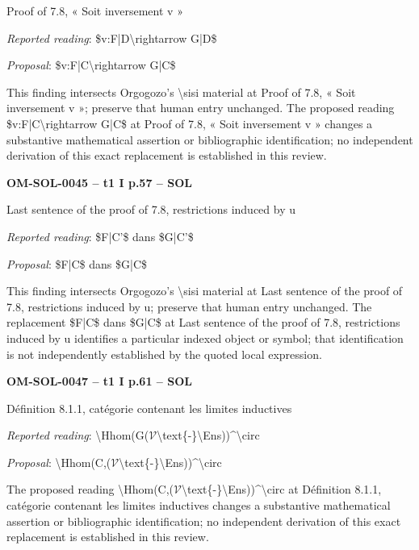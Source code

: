 Proof of 7.8, « Soit inversement v »\par
\emph{Reported reading}: \$v:F|D\textbackslash{}rightarrow G|D\$\par
\emph{Proposal}: \$v:F|C\textbackslash{}rightarrow G|C\$\par
This finding intersects Orgogozo's \textbackslash{}sisi material at Proof of 7.8, « Soit inversement v »; preserve that human entry unchanged. The proposed reading \$v:F|C\textbackslash{}rightarrow G|C\$ at Proof of 7.8, « Soit inversement v » changes a substantive mathematical assertion or bibliographic identification; no independent derivation of this exact replacement is established in this review.\par
\par\noindent\textbf{OM-SOL-0045 -- t1 I p.57 -- SOL}\par
Last sentence of the proof of 7.8, restrictions induced by u\par
\emph{Reported reading}: \$F|C'\$ dans \$G|C'\$\par
\emph{Proposal}: \$F|C\$ dans \$G|C\$\par
This finding intersects Orgogozo's \textbackslash{}sisi material at Last sentence of the proof of 7.8, restrictions induced by u; preserve that human entry unchanged. The replacement \$F|C\$ dans \$G|C\$ at Last sentence of the proof of 7.8, restrictions induced by u identifies a particular indexed object or symbol; that identification is not independently established by the quoted local expression.\par
\par\noindent\textbf{OM-SOL-0047 -- t1 I p.61 -- SOL}\par
Définition 8.1.1, catégorie contenant les limites inductives\par
\emph{Reported reading}: \textbackslash{}Hhom(G(\ensuremath{𝒱}\textbackslash{}text\{-\}\textbackslash{}Ens))\textasciicircum{}\textbackslash{}circ\par
\emph{Proposal}: \textbackslash{}Hhom(C,(\ensuremath{𝒱}\textbackslash{}text\{-\}\textbackslash{}Ens))\textasciicircum{}\textbackslash{}circ\par
The proposed reading \textbackslash{}Hhom(C,(\ensuremath{𝒱}\textbackslash{}text\{-\}\textbackslash{}Ens))\textasciicircum{}\textbackslash{}circ at Définition 8.1.1, catégorie contenant les limites inductives changes a substantive mathematical assertion or bibliographic identification; no independent derivation of this exact replacement is established in this review.\par
